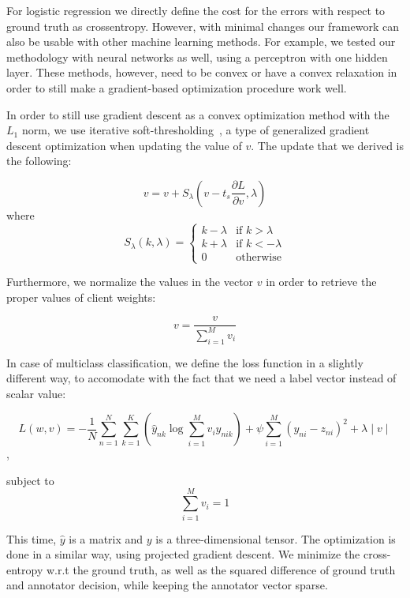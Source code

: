 \documentclass{llncs}
\begin{document}
For logistic regression we directly define the cost for the errors with respect to ground truth as crossentropy. However, with minimal changes our framework can also be usable with other machine learning methods. For example, we tested our methodology with neural networks as well, using a perceptron with one hidden layer. These methods, however, need to be convex or have a convex relaxation in order to still make a gradient-based optimization procedure work well.

In order to still use gradient descent as a convex optimization method with the $L_1$ norm, we use iterative soft-thresholding~\cite{bredies2007iterative}, a type of generalized gradient descent optimization when updating the value of $v$. The update that we derived is the following:

\begin{equation}
 v= v + S_{\lambda} (v-t_s \frac{\partial L}{\partial v}, \lambda)
\end{equation}
where
\begin{equation}
S_{\lambda} (k, \lambda) = 
\left\{
	\begin{array}{ll}
		k-\lambda  & \mbox{if } k > \lambda  \\
		k+\lambda & \mbox{if } k < -\lambda \\
		0 & \mbox{otherwise}
	\end{array}
\right.
\end{equation}

Furthermore, we normalize the values in the vector $v$ in order to retrieve the proper values of client weights:

\begin{equation}
v = \frac{v}{\sum_{i=1}^M v_i}
\end{equation}

In case of multiclass classification, we define the loss function in a slightly different way, to accomodate with the fact that we need a label vector instead of scalar value:

\begin{equation}
 L(w,v)= -\frac{1}{N} \sum_{n=1}^N \sum_{k=1}^K (\hat{y}_{nk} \log \sum_{i=1}^M v_i y_{nik}) + \psi \sum_{i=1}^{M} (y_{ni} - z_{ni})^2+\lambda \mid v \mid
\end{equation}, 

subject to
\begin{equation}
 \sum_{i=1}^{M} v_i = 1 
\end{equation}

This time, $\hat{y}$ is a matrix and $y$ is a three-dimensional tensor. The optimization is done in a similar way, using projected gradient descent. We minimize the cross-entropy w.r.t the ground truth, as well as the squared difference of ground truth and annotator decision, while keeping the annotator vector sparse.
\end{document}

